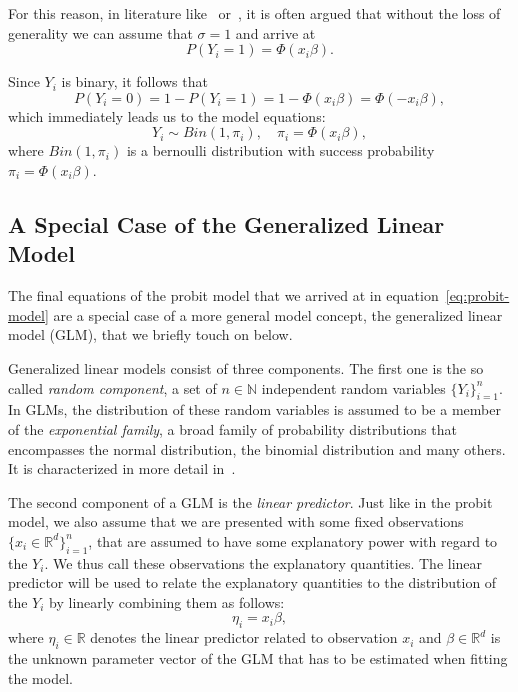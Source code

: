 For this reason, in literature like~\cite{regression-fahrmeir}
or~\cite{glm-agresti}, it is
often argued that without the loss of generality we can assume that
$\sigma = 1$ and arrive at
\begin{equation*}
    P(Y_i = 1) = \Phi(x_i \beta).
\end{equation*}

\noindent{}Since $Y_i$ is binary, it follows that
\begin{equation*}
    P(Y_i = 0) = 1 - P(Y_i = 1) = 1 - \Phi(x_i \beta) = \Phi(-x_i \beta),
\end{equation*}
which immediately leads us to the model equations:
\begin{equation}
    \label{eq:probit-model}
    Y_i \sim Bin(1, \pi_i), \quad \pi_i = \Phi(x_i \beta),
\end{equation}
where $Bin(1, \pi_i)$ is a bernoulli distribution with success
probability $\pi_i = \Phi(x_i \beta)$.

\subsection{A Special Case of the Generalized Linear Model}

The final equations of the probit model that we arrived at
in equation~\ref{eq:probit-model} are a special case of a more
general model concept, the generalized linear model (GLM),
that we briefly touch on below.

Generalized linear models consist of three components.
The first one is the so called \textit{random component},
a set of $n \in \mathbb{N}$ independent random variables $\{ Y_i \}_{i=1}^n$.
In GLMs, the distribution of these random variables is assumed
to be a member of the \textit{exponential family}, a broad family of
probability distributions that encompasses the normal distribution,
the binomial distribution and many others.
It is characterized in more detail in~\cite{glm-agresti}.

The second component of a GLM is the \textit{linear predictor}.
Just like in the probit model, we also assume that we are
presented with some fixed observations $\{x_i \in \mathbb{R}^d\}_{i=1}^n$,
that are assumed to have some explanatory power with regard to
the $Y_i$. We thus call these observations the explanatory quantities.
The linear predictor will be used to relate the explanatory quantities
to the distribution of the $Y_i$ by linearly combining them as follows:
\begin{equation*}
    \eta_i = x_i \beta,
\end{equation*}
where $\eta_i \in \mathbb{R}$ denotes the linear predictor related
to observation $x_i$ and
$\beta \in \mathbb{R}^d$ is the unknown parameter vector of the GLM
that has to be estimated when fitting the model.


